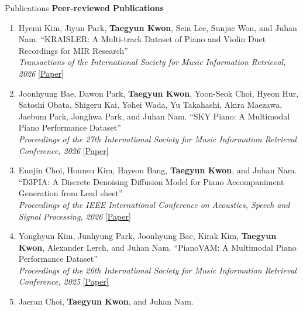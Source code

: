 \begin{rSection}{Publications}
\textbf{Peer-reviewed Publications}
\begin{enumerate}
\item \begin{minipage}[t]{\linewidth}Hyemi Kim, Jiyun Park, \textbf{Taegyun Kwon}, Sein Lee, Sunjae Won, and Juhan Nam.
``KRAISLER: A Multi-track Dataset of Piano and Violin Duet Recordings for MIR Research''\\\textit{Transactions of the International Society for Music Information Retrieval, 2026}
\href{https://transactions.ismir.net/articles/10.5334/tismir.338}{[Paper]}
\end{minipage}
\item \begin{minipage}[t]{\linewidth}Joonhyung Bae, Dawon Park, \textbf{Taegyun Kwon}, Yoon-Seok Choi, Hyeon Hur, Satoshi Obata, Shigeru Kai, Yohei Wada, Yu Takahashi, Akira Maezawa, Jaebum Park, Jonghwa Park, and Juhan Nam.
``SKY Piano: A Multimodal Piano Performance Dataset''\\\textit{Proceedings of the 27th International Society for Music Information Retrieval Conference, 2026}
\href{https://arxiv.org/abs/2607.27296}{[Paper]}
\end{minipage}
\item \begin{minipage}[t]{\linewidth}Eunjin Choi, Hounsu Kim, Hayeon Bang, \textbf{Taegyun Kwon}, and Juhan Nam.
``D3PIA: A Discrete Denoising Diffusion Model for Piano Accompaniment Generation from Lead sheet''\\\textit{Proceedings of the IEEE International Conference on Acoustics, Speech and Signal Processing, 2026}
\href{https://arxiv.org/abs/2602.03523}{[Paper]}
\end{minipage}
\item \begin{minipage}[t]{\linewidth}Yonghyun Kim, Junhyung Park, Joonhyung Bae, Kirak Kim, \textbf{Taegyun Kwon}, Alexander Lerch, and Juhan Nam.
``PianoVAM: A Multimodal Piano Performance Dataset''\\\textit{Proceedings of the 26th International Society for Music Information Retrieval Conference, 2025}
\href{https://arxiv.org/abs/2509.08800}{[Paper]}
\end{minipage}
\item \begin{minipage}[t]{\linewidth}Jaeran Choi, \textbf{Taegyun Kwon}, and Juhan Nam.

\end{minipage}
\end{enumerate}
\end{rSection}
